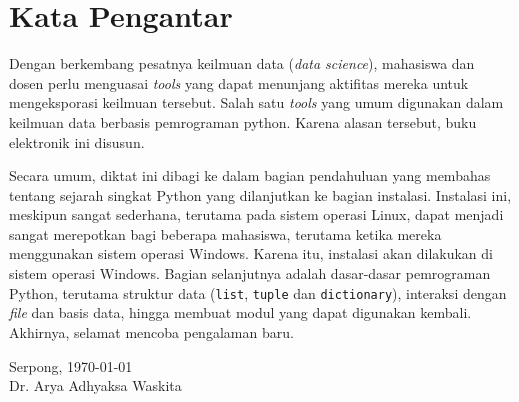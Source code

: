 \chapter*{Kata Pengantar}
Dengan berkembang pesatnya keilmuan data (\textit{data science}), mahasiswa dan dosen perlu menguasai \textit{tools} yang dapat menunjang aktifitas mereka untuk mengeksporasi keilmuan tersebut. Salah satu \textit{tools} yang umum digunakan dalam keilmuan data berbasis pemrograman python. Karena alasan tersebut, buku elektronik ini disusun.

Secara umum, diktat ini dibagi ke dalam bagian pendahuluan yang membahas tentang sejarah singkat Python yang dilanjutkan ke bagian instalasi. Instalasi ini, meskipun sangat sederhana, terutama pada sistem operasi Linux, dapat menjadi sangat merepotkan bagi beberapa mahasiswa, terutama ketika mereka menggunakan sistem operasi Windows. Karena itu, instalasi akan dilakukan di sistem operasi Windows. Bagian selanjutnya adalah dasar-dasar pemrograman Python, terutama struktur data (\texttt{list}, \texttt{tuple} dan \texttt{dictionary}), interaksi dengan \textit{file} dan basis data, hingga membuat modul yang dapat digunakan kembali. Akhirnya, selamat mencoba pengalaman baru. 

\vspace*{2cm}
\begin{flushright}
Serpong, \today\\[0.1cm]
\vspace*{1cm}
Dr. Arya Adhyaksa Waskita

\end{flushright}
